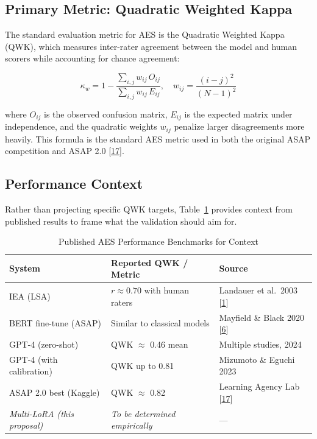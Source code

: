 \documentclass[12pt]{article}
\begin{document}
\subsection{Primary Metric: Quadratic Weighted Kappa}

The standard evaluation metric for AES is the Quadratic Weighted Kappa (QWK), which measures inter-rater agreement between the model and human scorers while accounting for chance agreement:

\begin{equation}
    \kappa_w = 1 - \frac{\sum_{i,j} w_{ij}\, O_{ij}}{\sum_{i,j} w_{ij}\, E_{ij}}, \quad w_{ij} = \frac{(i - j)^2}{(N - 1)^2}
    \label{eq:qwk}
\end{equation}

\noindent where $O_{ij}$ is the observed confusion matrix, $E_{ij}$ is the expected matrix under independence, and the quadratic weights $w_{ij}$ penalize larger disagreements more heavily. This formula is the standard AES metric used in both the original ASAP competition and ASAP 2.0 [\hyperlink{ref17}{17}].

\subsection{Performance Context}

Rather than projecting specific QWK targets, Table~\ref{tab:metrics} provides context from published results to frame what the validation should aim for.

\begin{table}[H]
\centering
\caption{Published AES Performance Benchmarks for Context}
\label{tab:metrics}
\begin{tabular}{@{} l l l @{}}
\toprule
\textbf{System} & \textbf{Reported QWK / Metric} & \textbf{Source} \\
\midrule
IEA (LSA)               & $r \approx 0.70$ with human raters & Landauer et al.\ 2003 [\hyperlink{ref1}{1}] \\
BERT fine-tune (ASAP)    & Similar to classical models        & Mayfield \& Black 2020 [\hyperlink{ref6}{6}] \\
GPT-4 (zero-shot)        & QWK $\approx$ 0.46 mean            & Multiple studies, 2024 \\
GPT-4 (with calibration) & QWK up to 0.81                     & Mizumoto \& Eguchi 2023 \\
ASAP 2.0 best (Kaggle)   & QWK $\approx$ 0.82                 & Learning Agency Lab [\hyperlink{ref17}{17}] \\
\midrule
\textit{Multi-LoRA (this proposal)} & \textit{To be determined empirically} & --- \\
\bottomrule
\end{tabular}
\end{table}
\end{document}
